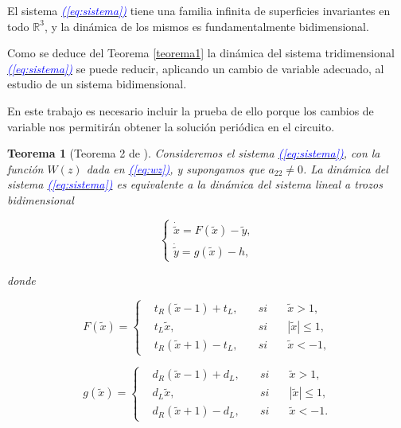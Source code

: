 \documentclass[12pt,a4paper]{report} %
\newtheorem{theorem}{Teorema}[chapter]
\newcommand{\eref}[1]{\hyperref[#1]{\textcolor{blue}{\textit{(\ref*{#1})}}}}
\begin{document}
		\vspace{0.5cm}\noindent El sistema \eref{eq:sistema} tiene una familia infinita de superficies invariantes en todo $\mathbb{R}^3$, y la dinámica de los mismos es fundamentalmente bidimensional.
	
	\vspace{0.5cm}Como se deduce del Teorema \ref{teorema1} la dinámica del sistema tridimensional \eref{eq:sistema} se puede reducir, aplicando un cambio de variable adecuado, al estudio de un sistema bidimensional.
	
	\vspace{0.5cm}\noindent En este trabajo es necesario incluir la prueba de ello porque los cambios de variable nos permitirán obtener la solución periódica en el circuito.
	
	\newpage
	
	\begin{theorem}[Teorema 2 de \cite{ponce}]
		Consideremos el sistema \eref{eq:sistema}, con la función $W(z)$ dada en \eref{eq:wz}, y supongamos que $a_{22}\neq 0$. La dinámica del sistema \eref{eq:sistema} es equivalente a la dinámica del sistema lineal a trozos bidimensional
		
		\begin{equation}
			\label{eq:sis2ec}
			\left\{
			\begin{gathered}
				\dot{\tilde{x}}=F(\tilde{x})-\tilde{y}, \\[2mm]
				\dot{\tilde{y}}=g(\tilde{x})-h,
			\end{gathered}
			\right.
		\end{equation}
		
		donde
		
		\begin{equation}
			\label{eq:f1}
			F(\tilde{x})=
			\left\{
			\begin{aligned}
				&t_R(\tilde{x}-1)+t_L, \quad &si& \quad \tilde{x}>1,\\
				&t_L\tilde{x}, &si& \quad |\tilde{x}|\leq 1,\\
				&t_R(\tilde{x}+1)-t_L, \quad &si& \quad \tilde{x}<-1,
			\end{aligned}
			\right.
		\end{equation}\smallskip
		
		\begin{equation}
			\label{eq:g1}
			g(\tilde{x})=
			\left\{
			\begin{aligned}
				&d_R(\tilde{x}-1)+d_L, \quad &si& \quad \tilde{x}>1,\\
				&d_L\tilde{x}, &si& \quad |\tilde{x}|\leq 1,\\
				&d_R(\tilde{x}+1)-d_L, \quad &si& \quad \tilde{x}<-1.
			\end{aligned}
			\right.
		\end{equation}\smallskip
		
	\end{theorem}
		
\end{document}
